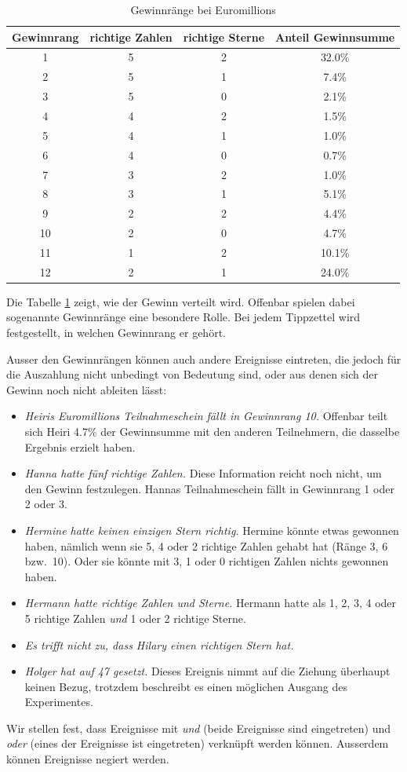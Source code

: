 \begin{table}
\begin{center}
\begin{tabular}{|c|c|c|c|}
\hline
Gewinnrang&richtige Zahlen&richtige Sterne&Anteil Gewinnsumme\\
\hline
1&5&2&32.0\%\\
2&5&1&7.4\%\\
3&5&0&2.1\%\\
4&4&2&1.5\%\\
5&4&1&1.0\%\\
6&4&0&0.7\%\\
7&3&2&1.0\%\\
8&3&1&5.1\%\\
9&2&2&4.4\%\\
10&2&0&4.7\%\\
11&1&2&10.1\%\\
12&2&1&24.0\%\\
\hline
\end{tabular}
\end{center}
\caption{Gewinnränge bei Euromillions\label{gewinnraenge}}
\end{table}

Die Tabelle \ref{gewinnraenge} zeigt, wie der Gewinn verteilt wird.
Offenbar spielen dabei sogenannte Gewinnränge eine besondere Rolle.
Bei jedem Tippzettel wird festgestellt, in welchen Gewinnrang er
gehört.

Ausser den Gewinnrängen können auch andere Ereignisse eintreten,
die jedoch für die Auszahlung nicht unbedingt von Bedeutung sind,
oder aus denen sich der Gewinn noch nicht ableiten lässt:
\begin{itemize}
\item {\it Heiris Euromillions Teilnahmeschein fällt in Gewinnrang 10.}
Offenbar teilt sich Heiri 4.7\% der Gewinnsumme mit den anderen Teilnehmern,
die dasselbe Ergebnis erzielt haben.
\item {\it Hanna hatte fünf richtige Zahlen.}
Diese Information reicht noch nicht, um den Gewinn festzulegen.
Hannas Teilnahmeschein fällt in Gewinnrang 1 oder 2 oder 3.
\item {\it Hermine hatte keinen einzigen Stern richtig.}
Hermine könnte
etwas gewonnen haben, nämlich wenn sie 5, 4 oder 2 richtige Zahlen
gehabt hat (Ränge 3, 6 bzw.~10).
Oder sie könnte mit 3, 1 oder 0 richtigen Zahlen nichts gewonnen haben.
\item {\it Hermann hatte richtige Zahlen und Sterne.}
Hermann hatte als 1, 2, 3, 4 oder 5 richtige Zahlen {\em und}
1 oder 2 richtige Sterne.
\item {\it Es trifft nicht zu, dass Hilary einen richtigen Stern hat.}
\item {\it Holger hat auf 47 gesetzt.}
Dieses Ereignis nimmt auf die Ziehung überhaupt keinen Bezug,
trotzdem beschreibt es einen möglichen Ausgang des Experimentes.
\end{itemize}
Wir stellen fest, dass Ereignisse mit {\em und} (beide Ereignisse sind
eingetreten) und {\em oder} (eines der Ereignisse ist
eingetreten) verknüpft werden können.
Ausserdem können Ereignisse negiert werden.

